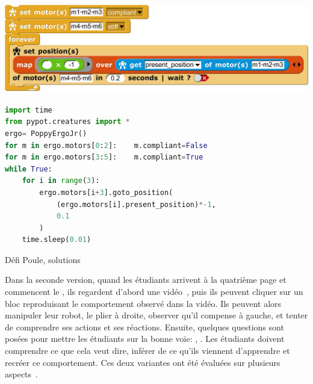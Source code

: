                 \begin{code}[!h]
                \begin{minipage}{\linewidth}
                    \label{fig:prog_poule_snap}\par%
                    \includegraphics[width=0.8\linewidth]{Figures/prog-poule.png}
                \end{minipage}
                \begin{minipage}{\linewidth}
\label{fig:prog_poule_python}
\begin{lstlisting}[language=Python,basicstyle=\footnotesize]
import time
from pypot.creatures import *
ergo= PoppyErgoJr()
for m in ergo.motors[0:2]:    m.compliant=False
for m in ergo.motors[3:5]:    m.compliant=True
while True:
    for i in range(3):
        ergo.motors[i+3].goto_position(
            (ergo.motors[i].present_position)*-1,
            0.1
        )
    time.sleep(0.01)
\end{lstlisting}
                \end{minipage}
                \vspace{-0.5cm}
                \caption[Défi Poule, solutions (\textit{Snap!} et python)]{Défi Poule, solutions}\label{fig:prog_poule}
                \end{code}\par%
                Dans la seconde version, quand les étudiants arrivent à la quatrième page et commencent le  , ils regardent d'abord une vidéo~, puis ils peuvent cliquer sur un bloc reproduisant le comportement observé dans la vidéo. Ils peuvent alors manipuler leur robot, le plier à droite, observer qu'il compense à gauche, \etc et tenter de comprendre ses actions et ses réactions. Ensuite, quelques questions sont posées pour mettre les étudiants sur la bonne voie: , . Les étudiants doivent comprendre ce que cela veut dire, inférer de ce qu'ils viennent d'apprendre et recréer ce comportement.
                Ces deux variantes ont été évaluées sur plusieurs aspects~.
